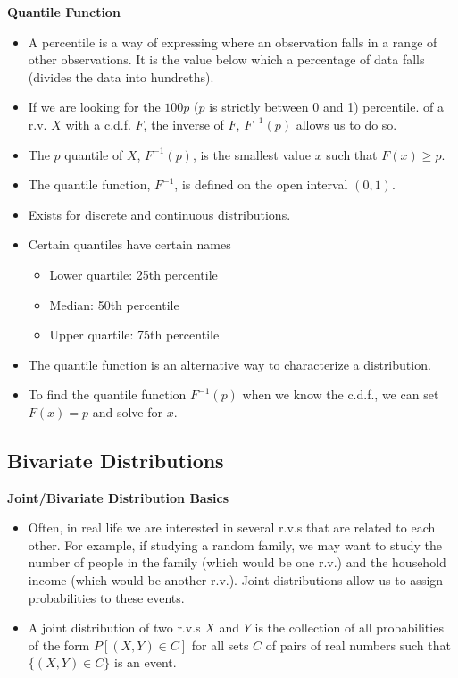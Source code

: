 \documentclass[11pt]{article}
\begin{document}
\textbf{Quantile Function}
\begin{itemize}
    \item A percentile is a way of expressing where an observation falls in a range of other 
    observations. It is the value below which a percentage of data falls (divides the data into
    hundreths).
    \item If we are looking for the $100p$ ($p$ is strictly between 0 and 1) percentile.
    of a r.v. $X$ with a c.d.f. $F$, the inverse of $F$, $F^{-1}(p)$ allows us to do so.
    \item The $p$ quantile of $X$, $F^{-1}(p)$, is the smallest value $x$ such that $F(x) \ge p$.
    \item The quantile function, $F^{-1}$, is defined on the open interval $(0,1)$.
    \item Exists for discrete and continuous distributions.
    \item Certain quantiles have certain names
    \begin{itemize}
        \item Lower quartile: 25th percentile
        \item Median: 50th percentile
        \item Upper quartile: 75th percentile
    \end{itemize}
    \item The quantile function is an alternative way to characterize a distribution.
    \item To find the quantile function $F^{-1}(p)$ when we know the c.d.f., we can set $F(x)=p$ and 
    solve for $x$.
\end{itemize}

\subsection{Bivariate Distributions}

\textbf{Joint/Bivariate Distribution Basics}
\begin{itemize}
    \item Often, in real life we are interested in several r.v.s that are related to each 
    other. For example, if studying a random family, we may want to study the number of people
    in the family (which would be one r.v.) and the household income (which would be another
    r.v.). Joint distributions allow us to assign probabilities to these events.
    \item A joint distribution of two r.v.s $X$ and $Y$ is the collection of all probabilities 
    of the form $P[(X,Y) \in C]$ for all sets $C$ of pairs of real numbers such that $\{(X, Y)
    \in C\}$ is an event.
\end{itemize}
\end{document}
